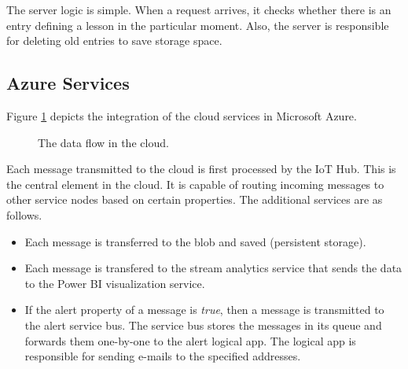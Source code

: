 \documentclass[a4paper, 11pt]{article}
\begin{document}
	The server logic is simple. When a request arrives, it checks whether there is an entry defining a lesson in the particular moment. Also, the server is responsible for deleting old entries to save storage space.
	\subsection{Azure Services}
	Figure \ref{fig:cloud} depicts the integration of the cloud services in Microsoft Azure.
	
	\begin{figure}[h!]
		\center
		\caption{The data flow in the cloud.}
		\label{fig:cloud}
	\end{figure}

	 Each message transmitted to the cloud is first processed by the IoT Hub. This is the central element in the cloud. It is capable of routing incoming messages to other service nodes based on certain properties. The additional services are as follows.
	 \begin{itemize}
	 	\item Each message is transferred to the blob and saved (persistent storage).
	 	\item Each message is transfered to the stream analytics service that sends the data to the Power BI visualization service.
	 	\item If the alert property of a message is \textsl{true}, then a message is transmitted to the alert service bus. The service bus stores the messages in its queue and forwards them one-by-one to the alert logical app. The logical app is responsible for sending e-mails to the specified addresses.
	 \end{itemize}
	
\end{document}
